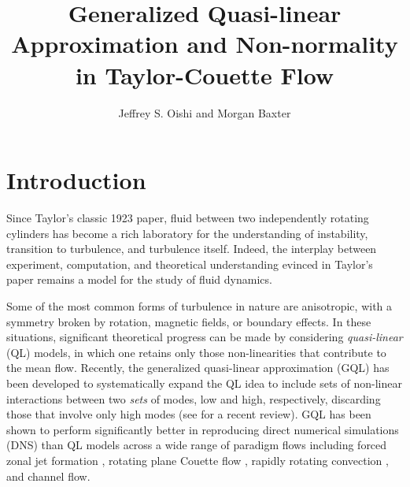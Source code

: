 \documentclass[openacc]{rstransa}%
\begin{document}
\title{Generalized Quasi-linear Approximation and Non-normality in Taylor-Couette Flow}

\author{%
Jeffrey S. Oishi and Morgan Baxter}

\address{Department of Physics and Astronomy, Bates College, Lewiston, ME USA}

\subject{xxxxx, xxxxx, xxxx}



\begin{abstract}

\end{abstract}


\begin{fmtext}
\end{fmtext}

\maketitle

\section{Introduction}
\label{sec:intro}
Since Taylor's classic 1923 paper\cite{1923RSPTA.223..289T}, fluid between two independently rotating cylinders has become a rich laboratory for the understanding of instability, transition to turbulence, and turbulence itself. Indeed, the interplay between experiment, computation, and theoretical understanding evinced in Taylor's paper remains a model for the study of fluid dynamics.

Some of the most common forms of turbulence in nature are anisotropic, with a symmetry broken by rotation, magnetic fields, or boundary effects. In these situations, significant theoretical progress can be made by considering \emph{quasi-linear} (QL) models, in which one retains only those non-linearities that contribute to the mean flow. Recently, the generalized quasi-linear approximation (GQL) has been developed to systematically expand the QL idea to include sets of non-linear interactions between two \emph{sets} of modes, low and high, respectively, discarding those that involve only high modes (see \cite{2022arXiv220505513M} for a recent review). GQL has been shown to perform significantly better in reproducing direct numerical simulations (DNS) than QL models across a wide range of paradigm flows including forced zonal jet formation \cite{2016PhRvL.116u4501M}, rotating plane Couette flow \cite{2017JFM...810..412T}, rapidly rotating convection \cite{2018RSPSA.47480422T}, and channel flow\cite{2019Kellam}. 
\end{document}
